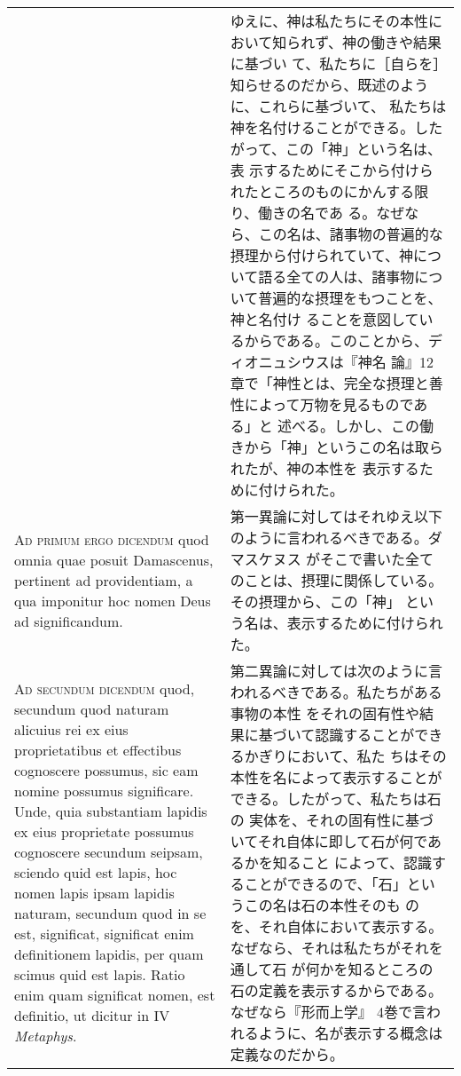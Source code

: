 \documentclass[10pt]{jsarticle}
\begin{document}
\begin{longtable}{p{21em}p{21em}}
& ゆえに、神は私たちにその本性において知られず、神の働きや結果に基づい
て、私たちに［自らを］知らせるのだから、既述のように、これらに基づいて、
私たちは神を名付けることができる。したがって、この「神」という名は、表
示するためにそこから付けられたところのものにかんする限り、働きの名であ
る。なぜなら、この名は、諸事物の普遍的な摂理から付けられていて、神につ
いて語る全ての人は、諸事物について普遍的な摂理をもつことを、神と名付け
ることを意図しているからである。このことから、ディオニュシウスは『神名
論』12章で「神性とは、完全な摂理と善性によって万物を見るものである」と
述べる。しかし、この働きから「神」というこの名は取られたが、神の本性を
表示するために付けられた。

\\

{\scshape Ad primum ergo dicendum} quod omnia quae posuit Damascenus,
pertinent ad providentiam, a qua imponitur hoc nomen Deus ad
significandum.

&

第一異論に対してはそれゆえ以下のように言われるべきである。ダマスケヌス
がそこで書いた全てのことは、摂理に関係している。その摂理から、この「神」
という名は、表示するために付けられた。

\\

{\scshape Ad secundum dicendum} quod, secundum quod naturam alicuius
rei ex eius proprietatibus et effectibus cognoscere possumus, sic eam
nomine possumus significare. Unde, quia substantiam lapidis ex eius
proprietate possumus cognoscere secundum seipsam, sciendo quid est
lapis, hoc nomen lapis ipsam lapidis naturam, secundum quod in se est,
significat, significat enim definitionem lapidis, per quam scimus quid
est lapis.  Ratio enim quam significat nomen, est definitio, ut
dicitur in IV {\itshape Metaphys}.

&

第二異論に対しては次のように言われるべきである。私たちがある事物の本性
をそれの固有性や結果に基づいて認識することができるかぎりにおいて、私た
ちはその本性を名によって表示することができる。したがって、私たちは石の
実体を、それの固有性に基づいてそれ自体に即して石が何であるかを知ること
によって、認識することができるので、「石」というこの名は石の本性そのも
のを、それ自体において表示する。なぜなら、それは私たちがそれを通して石
が何かを知るところの石の定義を表示するからである。なぜなら『形而上学』
4巻で言われるように、名が表示する概念は定義なのだから。

\\


\end{longtable}
\end{document}
